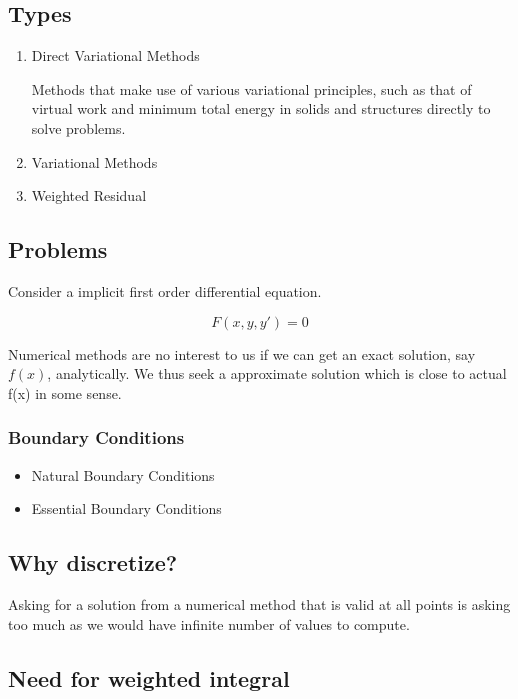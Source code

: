 \documentclass[12pt,a4paper]{article}
\begin{document}
	\subsection{Types}
	\begin{enumerate}
		\item Direct Variational Methods
		
		Methods that make use of various variational principles, such as that of virtual work and minimum total energy in solids and structures directly to solve problems.
		
		\item Variational Methods
		
		
		\item Weighted Residual
		
	\end{enumerate}	
	\subsection{Problems}
	Consider a implicit first order differential equation. 
	
	\[ F(x,y,y') = 0 \]
	
	Numerical methods are no interest to us if we can get an exact solution, say $ f(x) $, analytically. We thus seek a approximate solution which is close to actual f(x) in some sense.
	
	\subsubsection{Boundary Conditions}
	
		\begin{itemize}
			\item Natural Boundary Conditions
			\item Essential Boundary Conditions
		\end{itemize}
	 
	 \subsection{Why discretize?}
	 
	 Asking for a solution from a numerical method that is valid at all points is asking too much as we would have infinite number of values to compute. 
	 
	 
	 
	 \subsection{Need for weighted integral}
	 
\end{document}
